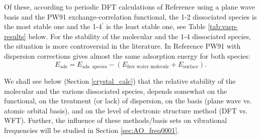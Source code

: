 \documentclass[11pt,DIV=13,BCOR=5mm,a4paper,headinclude]{scrbook}
\begin{document}
Of these, according to periodic DFT calculations of Reference\cite{WirthJPCC2012} using a plane wave basis and the PW91 exchange-correlation functional, the 1-2 dissociated species is the most stable one and the 1-4$^\prime$ is the least stable one, see Table \ref{tab:vasp-results} below.
For the stability of the molecular and the 1-4 dissociated species, the situation is more controversial in the literature\cite{WirthJPCC2012,hass00,Ranea2009}.
In Reference\cite{WirthJPCC2012} PW91 with dispersion corrections gives almost the same adsorption energy for both species:
\begin{equation}\label{eq:Eads1}
  E_\textrm{ads}=E_\textrm{ads. species}-(E_\text{free water molecule}+E_\text{surface}).
\end{equation}

We shall see below (Section \ref{crystal_calc}) that the relative stability of the molecular and the various dissociated species, depends somewhat on the functional, on the treatment (or lack) of dispersion, on the basis (plane wave vs. atomic orbital basis), and on the level of electronic structure method (DFT vs. WFT).
Further, the influence of these methods/basis sets on vibrational frequencies will be studied in Section \ref{sec:AO_freq0001}.
\end{document}
